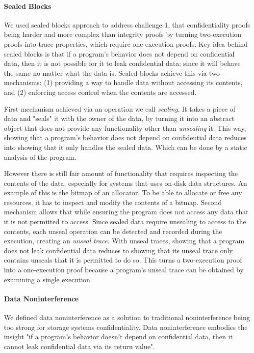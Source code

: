 \paragraph{Sealed Blocks}
We used sealed blocks approach to address challenge 1, that confidentiality proofs being harder and more complex than integrity proofs by turning two-execution proofs into trace properties, which require one-execution proofs. Key idea behind sealed blocks is that if a program's behavior does not depend on confidential data, then it is not possible for it to leak confidential data; since it will behave the same no matter what the data is. Sealed blocks achieve this via two mechanisms: (1) providing a way to handle data without accessing its contents, and (2) enforcing access control when the contents are accessed. 

First mechanism achieved via an operation we call \emph{sealing}. It takes a piece of data and "seals" it with the owner of the data, by turning it into an abstract object that does not provide any functionality other than \emph{unsealing} it. This way, showing that a program's behavior does not depend on confidential data reduces into showing that it only handles the sealed data. Which can be done by a static analysis of the program.

However there is still fair amount of functionality that requires inspecting the contents of the data, especially for systems that uses on-disk data structures. An example of this is the bitmap of an allocator. To be able to allocate or free any resources,  it has to inspect and modify the contents of a bitmap. Second mechanism allows that while ensuring the program does not access any data that it is not permitted to access. Since sealed data require unsealing to access to the contents, each unseal operation can be detected and recorded during the execution, creating an \emph{unseal trace}. With unseal traces, showing that a program does not leak confidential data reduces to showing that its unseal trace only contains unseals that it is permitted to do so. This turns a two-execution proof into a one-execution proof because a program's unseal trace can be obtained by examining a single execution.

\paragraph{\red Data Noninterference}
We defined data noninterference as a solution to traditional noninterference being too strong for storage systems confidentiality. Data noninterference embodies the insight "if a program's behavior doesn't depend on confidential data, then it cannot leak confidential data via its return value". 

